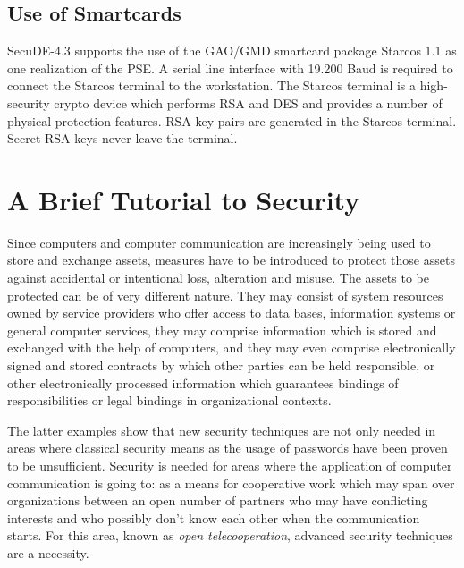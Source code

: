 \subsection{Use of Smartcards}
   SecuDE-4.3 supports the use of the GAO/GMD smartcard package Starcos 1.1 as
   one realization of the PSE. A serial line interface with 19.200 Baud is required
   to connect the Starcos terminal to the workstation. The Starcos terminal
   is a high-security crypto device which performs RSA and DES and provides a number of 
   physical protection features. RSA key pairs are generated in the Starcos terminal. 
   Secret RSA keys never leave the terminal.

\section{A Brief Tutorial to Security}
\label{tutorial}
\pagestyle{myheadings}
Since computers and computer communication are increasingly being used to store and
exchange assets, measures have to be introduced to protect those assets
against accidental or intentional loss, alteration and misuse. The assets to be protected
can be of very different nature. They may consist of system resources owned by service providers
who offer access to data bases, information systems or general computer services, they may comprise
information which is stored and exchanged with the help of computers, and they may even comprise 
electronically signed and stored contracts by which other parties can be held responsible, or
other electronically processed information which guarantees bindings of responsibilities
or legal bindings in organizational contexts. 

The latter examples show that new security techniques are not only needed in areas
where classical security means as the usage of passwords have been proven to be 
unsufficient. Security is needed for areas where the application of computer
communication is going to: as a means for cooperative work which may
span over organizations between an open number of partners who may have 
conflicting interests and who possibly don't know each other when the communication
starts. For this area, known as {\em open telecooperation}, 
advanced security techniques are a necessity. 

